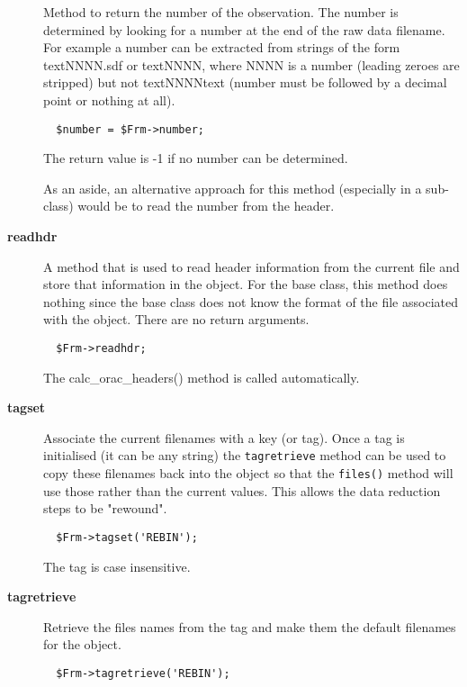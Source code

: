 \begin{description}
Method to return the number of the observation. The number is
determined by looking for a number at the end of the raw data
filename.  For example a number can be extracted from strings of the
form textNNNN.sdf or textNNNN, where NNNN is a number (leading zeroes
are stripped) but not textNNNNtext (number must be followed by a decimal
point or nothing at all).

\begin{verbatim}
  $number = $Frm->number;
\end{verbatim}


The return value is -1 if no number can be determined.



As an aside, an alternative approach for this method (especially
in a sub-class) would be to read the number from the header.

\item[\textbf{readhdr}] \mbox{}

A method that is used to read header information from the current
file and store that information in the object. For the base class,
this method does nothing since the base class does not know 
the format of the file associated with the object. There are
no return arguments.

\begin{verbatim}
  $Frm->readhdr;
\end{verbatim}


The calc\_orac\_headers() method is called automatically.

\item[\textbf{tagset}] \mbox{}

Associate the current filenames with a key (or tag). Once a tag
is initialised (it can be any string) the \texttt{tagretrieve} method
can be used to copy these filenames back into the object so that
the \texttt{files()} method will use those rather than the current
values. This allows the data reduction steps to be "rewound".

\begin{verbatim}
  $Frm->tagset('REBIN');
\end{verbatim}


The tag is case insensitive.

\item[\textbf{tagretrieve}] \mbox{}

Retrieve the files names from the tag and make them the default
filenames for the object.

\begin{verbatim}
  $Frm->tagretrieve('REBIN');
\end{verbatim}



\end{description}
